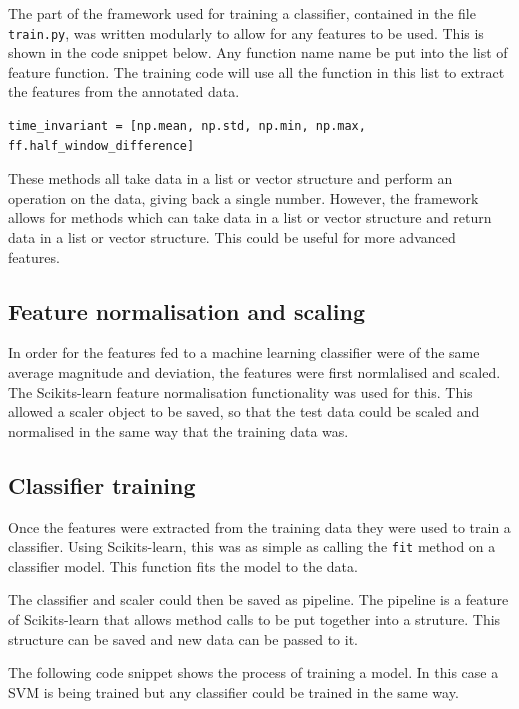 The part of the framework used for training a classifier, contained in the file \texttt{train.py}, was written modularly to allow for any features to be used. This is shown in the code snippet below. Any function name name be put into the list of feature function. The training code will use all the function in this list to extract the features from the annotated data. 

\begin{verbatim}
time_invariant = [np.mean, np.std, np.min, np.max, ff.half_window_difference]
\end{verbatim}

These methods all take data in a list or vector structure and perform an operation on the data, giving back a single number. However, the framework allows for methods which can take data in a list or vector structure and return data in a list or vector structure. This could be useful for more advanced features. 

\subsection{Feature normalisation and scaling}
In order for the features fed to a machine learning classifier were of the same average magnitude and deviation, the features were first normlalised and scaled. The Scikits-learn feature normalisation functionality was used for this. This allowed a scaler object to be saved, so that the test data could be scaled and normalised in the same way that the training data was. 

\subsection{Classifier training}
Once the features were extracted from the training data they were used to train a classifier. Using Scikits-learn, this was as simple as calling the \texttt{fit} method on a classifier model. This function fits the model to the data. 

The classifier and scaler could then be saved as pipeline. The pipeline is a feature of Scikits-learn that allows method calls to be put together into a struture. This structure can be saved and new data can be passed to it. 

The following code snippet shows the process of training a model. In this case a SVM is being trained but any classifier could be trained in the same way.

